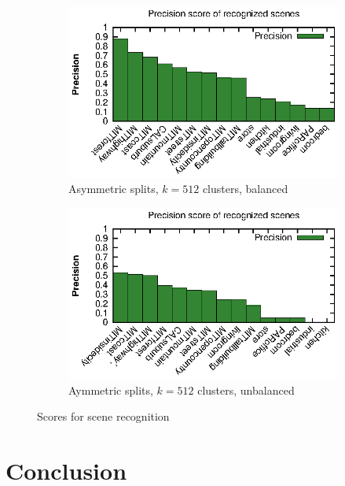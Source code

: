 \documentclass{vldb}
\begin{document}
\begin{figure}[ht]
  \centering
  \begin{subfigure}{.45\textwidth}
    \includegraphics[width = \textwidth]{figs/scores_sr_asymmetric_512classes_balanced.eps}
    \caption{Asymmetric splits, $k = 512$ clusters, balanced}
    \label{subfig:scores-sr-asymmetric-512-balanced}
  \end{subfigure}
  \begin{subfigure}{.45\textwidth}
    \includegraphics[width = \textwidth]{figs/scores_sr_asymmetric_256classes_unbalanced.eps}
    \caption{Aymmetric splits, $k = 512$ clusters, unbalanced}
    \label{subfig:scores-sr-asymmetric-512-unbalanced}
  \end{subfigure}
  \caption{Scores for scene recognition}
  \label{fig:scores-sr-asymmetric-512}
\end{figure}

\section{Conclusion}
\label{sec:conclusion}
\end{document}
